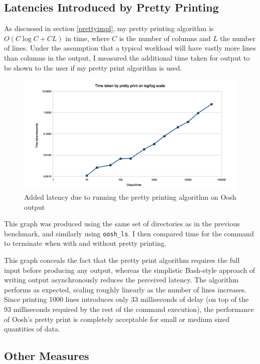 \documentclass[12pt,twoside,notitlepage]{report}
\begin{document}
\subsection{Latencies Introduced by Pretty Printing}
\label{prettyspeed}
As discussed in section \ref{prettyimpl}, my pretty printing algorithm
is $O(C \log C + CL)$ in time, where $C$ is the number of columns and
$L$ the number of lines. Under the assumption that a typical workload
will have vastly more lines than columns in the output, I measured
the additional time taken for output to be shown to the user if my
pretty print algorithm is used.

\begin{figure}[h]
\centering
\includegraphics[scale=0.5]{print_graph.png}
\caption{Added latency due to running the pretty printing algorithm on
  Oosh output}
\end{figure}

This graph was produced using the same set of directories as in the
previous benchmark, and similarly using {\tt oosh\_ls}. I then
compared time for the command to terminate when with and without
pretty printing.

This graph conceals the fact that the pretty print algorithm requires
the full input before producing any output, whereas the simplistic
Bash-style approach of writing output asynchronously reduces the
perceived latency. The algorithm performs as expected, scaling roughly
linearly as the number of lines increases. Since printing 1000 lines
introduces only 33 milliseconds of delay (on top of the 93
milliseconds required by the rest of the command execution), the
performance of Oosh's pretty print is completely acceptable for small
or medium sized quantities of data.

\subsection{Other Measures}
\label{othermeasures}
\end{document}
